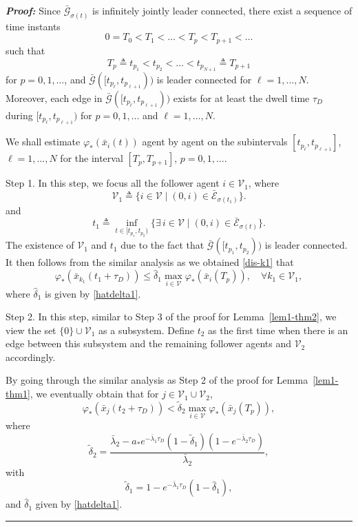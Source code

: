 \documentclass[a4paper, 11pt]{article}
\def \defn{\triangleq}
\newenvironment{IEEEproof}[1][\bf Proof]{\smallskip\par\noindent\textit{#1: }}{\hspace*{\fill} \rule{6pt}{6pt}\smallskip}
\begin{document}
\begin{IEEEproof}
Since $\bar{\mathcal{G}}_{\sigma(t)}$ is infinitely jointly leader connected, there exist a sequence of time instants
\begin{equation}\label{defnTp1}
0=T_0<T_1< \ldots < T_p < T_{p+1}< \ldots
\end{equation}
such that
\begin{equation}\label{defnTp2}
T_p \defn t_{p_1}< t_{p_2} <\ldots< t_{p_{N+1}} \defn T_{p+1}
\end{equation}
for $p=0,1,\ldots$, and $\bar{\mathcal{G}}([t_{p_\ell},t_{p_{\ell+1}}))$ is leader connected for $\ell=1,\ldots, N$.
Moreover, each edge in $\bar{\mathcal{G}}([t_{p_\ell},t_{p_{\ell+1}}))$
exists for at least the dwell time $\tau_D$ during $[t_{p_\ell},t_{p_{\ell+1}})$
for $p=0,1,\ldots$ and $\ell=1,\ldots, N$.

We shall estimate $\varphi_*(\bar{x}_i(t))$ agent by agent on the subintervals $[t_{p_\ell},t_{p_{\ell+1}}]$, $\ell=1,\ldots, N$
for the interval $[T_p,T_{p+1}]$, $p=0,1,\ldots$.

\noindent Step 1. In this step, we focus all the follower agent $i \in \mathcal{V}_1$, where
\[
\mathcal{V}_1 \defn \{ i \in \mathcal{V} \mid (0,i) \in \bar{\mathcal{E}}_{\sigma(t_1)}\}.
\]
and
\[
t_1 \defn \inf_{t \in [t_{p_1},t_{p_2})} \{\exists \, i \in \mathcal{V} \mid (0,i) \in \bar{\mathcal{E}}_{\sigma(t)}\}.
\]
The existence of $\mathcal{V}_1$ and $t_1$ due to the fact that $\bar{\mathcal{G}}([t_{p_1},t_{p_2}))$ is leader connected.
It then follows from the similar analysis as we obtained \eqref{dis-k1} that
\begin{equation}\label{phibark1}
\varphi_*(\bar{x}_{k_1}(t_1+\tau_D)) \leq \hat{\delta}_1 \max_{i \in \mathcal{V}}\varphi_*(\bar{x}_i(T_p)), \quad \forall k_1 \in \mathcal{V}_1,
\end{equation}
where $\hat{\delta}_1$ is given by \eqref{hatdelta1}.

\vspace*{2mm}

\noindent Step 2. In this step, similar to Step 3 of the proof for Lemma~\ref{lem1-thm2},
we view the set $\{0\} \cup \mathcal{V}_1$ as a subsystem. Define $t_2$ as the first time when
there is an edge between this subsystem and the remaining follower agents and $\mathcal{V}_2$ accordingly.

By going through the similar analysis as Step 2 of the proof for Lemma~\ref{lem1-thm1},
we eventually obtain that for $j \in \mathcal{V}_1 \cup \mathcal{V}_2$,
\[
\varphi_*(\bar{x}_{j}(t_2+\tau_D)) < \tilde{\delta}_2 \max_{i \in \mathcal{V}}\varphi_*(\bar{x}_{j}(T_p)),
\]
where
\begin{equation}\label{tildedelta2}
\tilde{{\delta}}_2 =\frac{\bar{\lambda}_2-a_* e^{-\bar{\lambda}_1 \tau_D}(1-\tilde{\delta}_1) (1-e^{-\bar{\lambda}_2 \tau_D})}{\bar{\lambda}_2},
\end{equation}
with
\begin{equation}\label{tildedelta1}
\tilde{\delta}_1=1-e^{-\bar{\lambda}_1\tau_D}(1-{\hat{\delta}}_1),
\end{equation}
and $\hat{\delta}_1$ given by \eqref{hatdelta1}.


\end{IEEEproof}
\end{document}
